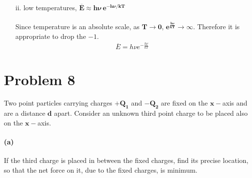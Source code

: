 \documentclass[]{article}
\begin{document}
{\begin{enumerate}
					\paragraph{} Utilizing the taylor series expansion $e^x = 1 + x + \frac{1}{2}x^2 + \dots$, and taking appropriate approximations.
					\begin{equation*}
						\begin{split}
							\overline{E} = \frac{h \nu}{\left( 1 + \frac{h \nu}{kT} \right) - 1} = kT
						\end{split}
					\end{equation*}
				\item[ii.] low temperatures, $\bm{\overline{E} \approx h\nu \, e^{-h\nu/kT}}$
					\paragraph{} Since temperature is an absolute scale, as $\bm{T\to 0}$, $\bm{e^{\frac{h \nu}{kT}}} \to \infty$. Therefore it is appropriate to drop the $- 1$.
					\begin{equation*}
						\begin{split}
							\overline{E} = h \nu e^{-\frac{h \nu}{kT}}
						\end{split}
					\end{equation*}
			\end{enumerate}	
			
			
	\section*{Problem 8}

		\paragraph{} Two point particles carrying charges $\bm{+Q_1}$ and $\bm{-Q_2}$ are fixed on the $\bm{x-}$axis and are a distance $\bm{d}$ apart. Consider an unknown third point charge to be placed also on the $\bm{x-}$axis.
	
		\paragraph{(a)} If the third charge is placed in between the fixed charges,	find its precise location, so that the net force on it, due to the fixed charges, is minimum.
		
}
\end{document}
